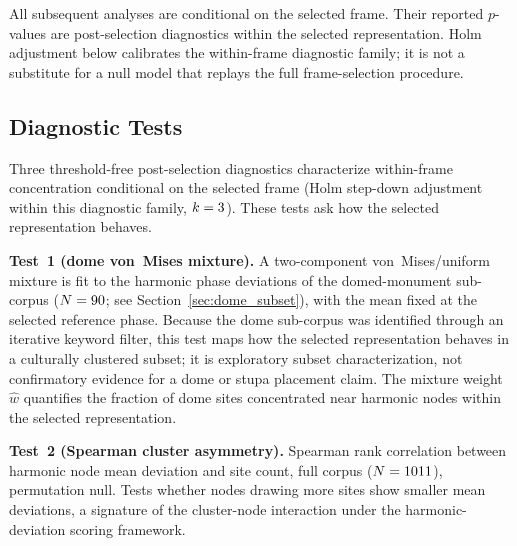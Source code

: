 \documentclass[12pt,a4paper]{article}
\begin{document}
All subsequent analyses are conditional on the selected frame. Their reported
$p$-values are post-selection diagnostics within the selected representation.
Holm adjustment below calibrates the within-frame diagnostic family; it is
not a substitute for a null model that replays the full frame-selection
procedure.

\medskip
\noindent{}

\subsection{Diagnostic Tests}
\label{sec:tests}

Three threshold-free post-selection diagnostics characterize within-frame
concentration conditional on the selected frame (Holm step-down adjustment
within this diagnostic family, $k = 3$). These tests ask how the selected
representation behaves.

\textbf{Test~1 (dome von~Mises mixture).} A two-component von~Mises/uniform
mixture is fit to the harmonic phase deviations of the domed-monument
sub-corpus ($N = 90$; see Section~\ref{sec:dome_subset}), with the
mean fixed at the selected reference phase. Because the dome sub-corpus was
identified through an iterative keyword filter, this test maps how the
selected representation behaves in a culturally clustered subset; it is
exploratory subset characterization, not confirmatory evidence for a dome or
stupa placement claim. The mixture weight $\hat{w}$ quantifies the fraction of
dome sites concentrated near harmonic nodes within the selected
representation.

\textbf{Test~2 (Spearman cluster asymmetry).} Spearman rank correlation
between harmonic node mean deviation and site count, full corpus
($N = 1011$), permutation null. Tests whether nodes drawing
more sites show smaller mean deviations, a signature of the cluster-node
interaction under the harmonic-deviation scoring framework.
\end{document}
